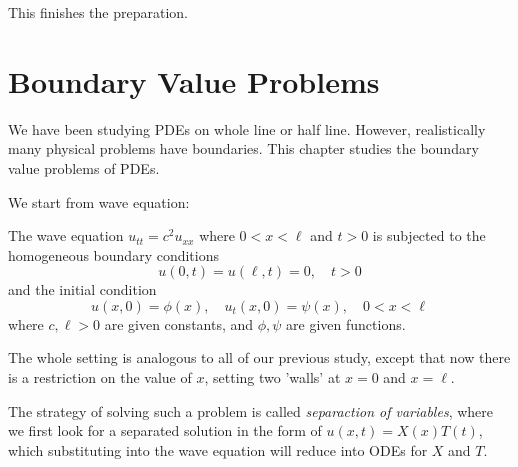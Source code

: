 This finishes the preparation.

\section{Boundary Value Problems}
We have been studying PDEs on whole line or half line. However, realistically many physical problems have boundaries. This chapter studies the boundary value problems of PDEs.

We start from wave equation:

\medskip

\begin{defn} 
    The wave equation $u_{tt} = c^2 u_{xx}$ where $0<x<\ell$ and $t>0$ is subjected to the homogeneous boundary conditions
    \[u(0,t) = u(\ell,t)=0, \quad t>0\]
    and the initial condition
    \[u(x,0) = \phi(x),\quad u_t(x,0)=\psi(x),\quad 0<x<\ell\]
    where $c,\ell>0$ are given constants, and $\phi,\psi$ are given functions.
\end{defn}

The whole setting is analogous to all of our previous study, except that now there is a restriction on the value of $x$, setting two 'walls' at $x=0$ and $x = \ell$.

The strategy of solving such a problem is called \emph{separaction of variables}, where we first look for a separated solution in the form of $u(x,t) = X(x)T(t)$, which substituting into the wave equation will reduce into ODEs for $X$ and $T$.

\medskip 

